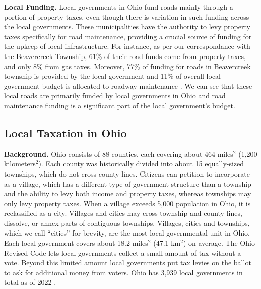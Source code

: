 {\bf Local Funding.} Local governments in Ohio fund roads mainly through a portion of property taxes, even though there is variation in such funding across the local governments. These municipalities have the authority to levy property taxes specifically for road maintenance, providing a crucial source of funding for the upkeep of local infrastructure. For instance, as per our correspondance with the Beavercreek Township, 61\% of their road funds come from property taxes, and only 8\% from gas taxes. Moreover, 77\% of funding for roads in Beavercreek township is provided by the local government and 11\% of overall local government budget is allocated to roadway maintenance \citep{schroeder2025}. We can see that these local roads are primarily funded by local governments in Ohio and road maintenance funding is a significant part of the local government's budget.


\subsection{Local Taxation in Ohio}

{\bf Background.} Ohio consists of 88 counties, each covering about 464 miles$^2$ (1,200 kilometers$^2$). Each county was historically divided into about 15 equally-sized townships, which do not cross county lines. Citizens can petition to incorporate as a village, which has a different type of government structure than a township and the ability to levy both income and property taxes, whereas townships may only levy property taxes. When a village exceeds 5,000 population in Ohio, it is reclassified as a city. Villages and cities may cross township and county lines, dissolve, or annex parts of contiguous townships. Villages, cities and townships, which we call “cities” for brevity, are the most local governmental unit in Ohio. Each local government covers about 18.2 miles$^2$ (47.1 km$^2$) on average. The Ohio Revised Code lets local governments collect a small amount of tax without a vote. Beyond this limited amount local governments put tax levies on the ballot to ask for additional money from voters. Ohio has 3,939 local governments in total as of 2022 \citep{stlouisfed2024local}.  

